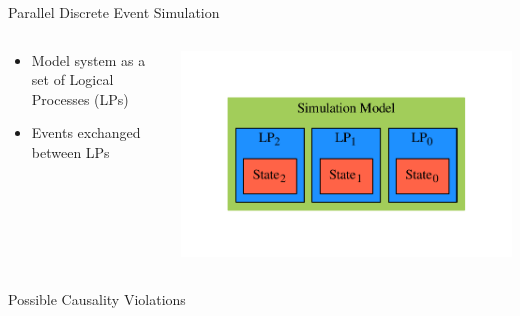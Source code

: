 \documentclass[10pt]{beamer}
\begin{document}
\begin{frame}{Parallel Discrete Event Simulation}

    \begin{columns}[c]

    \begin{column}{0.5\textwidth}
        \begin{itemize}
            \item Model system as a set of Logical Processes (LPs)
            \item Events exchanged between LPs
        \end{itemize}
    \end{column}

    \begin{column}{0.5\textwidth}
        \includegraphics[width=\textwidth]{../figs/graphviz/pdes.pdf}
    \end{column}

    \end{columns}

    \begin{block}{Possible Causality Violations}

        \begin{columns}[T]


\end{columns}
\end{block}
\end{frame}
\end{document}
